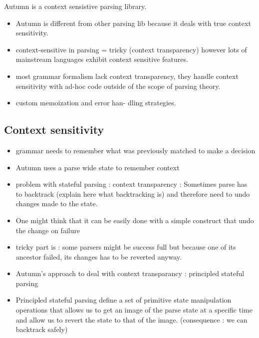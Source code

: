 	Autumn is a context sensistive parsing library.
	\begin{itemize}
		\item Autumn is different from other parsing lib because it deals with true context sensitivity.
		\item context-sensitive in parsing = tricky (context transparency) however lots of mainstream languages exhibit context sensitive features.
		\item most grammar formalism lack context transparency, they handle context sensitivity with ad-hoc code outside of the scope of parsing theory.
		\item  custom memoization and error han- dling strategies.

	\end{itemize}

	\subsection{Context sensitivity}

	\begin{itemize}
		\item grammar needs to remember what was previously matched to make a decision
		\item Autumn uses a parse wide state to remember context
		\item problem with stateful parsing : context transparency : Sometimes parse has to backtrack (explain here what backtracking is) and therefore need to undo changes made to the state.
		\item One might think that it can be easily done with a simple construct that undo the change on failure
		\item tricky part is : some parsers might be success full but because one of its ancestor failed, its changes has to be reverted anyway.
		\item Autumn's approach to deal with context transparancy : principled stateful parsing
		\item Principled stateful parsing define a set of primitive state manipulation operations that allows us to get an image of the parse state at a specific time and allow us to revert the state to that of the image. (consequence : we can backtrack safely)
	\end{itemize}

